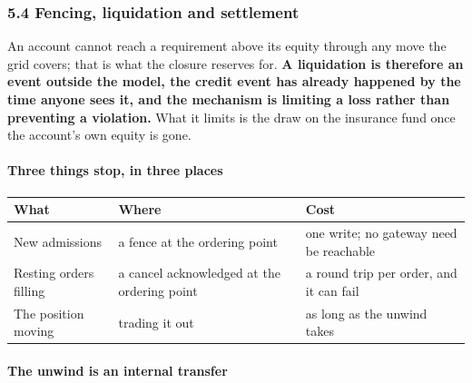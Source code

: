 \documentclass[10pt,a4paper]{article}
\newcounter{none}  %
\begin{document}
\subsubsection{5.4 Fencing, liquidation and settlement}\label{fencing-liquidation-and-settlement}

An account cannot reach a requirement above its equity through any move the grid
covers; that is what the closure reserves for. \textbf{A liquidation is therefore an
event outside the model, the credit event has already happened by the time anyone
sees it, and the mechanism is limiting a loss rather than preventing a
violation.} What it limits is the draw on the insurance fund once the account's
own equity is gone.

\paragraph{Three things stop, in three places}\label{three-things-stop-in-three-places}

{\def\LTcaptype{none} %
\begin{longtable}[]{@{}
  >{\raggedright\arraybackslash}p{}
  >{\raggedright\arraybackslash}p{}
  >{\raggedright\arraybackslash}p{}@{}}
\toprule\noalign{}
\begin{minipage}[b]{\linewidth}\raggedright
What
\end{minipage} & \begin{minipage}[b]{\linewidth}\raggedright
Where
\end{minipage} & \begin{minipage}[b]{\linewidth}\raggedright
Cost
\end{minipage} \\
\midrule\noalign{}
\endhead
\bottomrule\noalign{}
\endlastfoot
New admissions & a fence at the ordering point & one write; no gateway need be reachable \\
Resting orders filling & a cancel acknowledged at the ordering point & a round trip per order, and it can fail \\
The position moving & trading it out & as long as the unwind takes \\
\end{longtable}
}

\paragraph{The unwind is an internal transfer}\label{the-unwind-is-an-internal-transfer}
\end{document}
